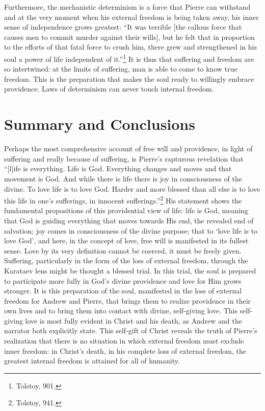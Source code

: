 \documentclass[12pt]{article}
\begin{document}
Furthermore, the mechanistic determinism is a force that Pierre can withstand and at the very moment when his external freedom is being taken away, his inner sense of independence grows greatest: ``It was terrible [the callous force that causes men to commit murder against their wills], but he felt that in proportion to the efforts of that fatal force to crush him, there grew and strengthened in his soul a power of life independent of it.''\footnote{Tolstoy, 901.} It is thus that suffering and freedom are so intertwined: at the limits of suffering, man is able to come to know true freedom. This is the preparation that makes the soul ready to willingly embrace providence. Laws of determinism can never touch internal freedom.

\section{Summary and Conclusions}

Perhaps the most comprehensive account of free will and providence, in light of suffering and really because of suffering, is Pierre’s rapturous revelation that ``[l]ife is everything. Life is God. Everything changes and moves and that movement is God. And while there is life there is joy in consciousness of the divine. To love life is to love God. Harder and more blessed than all else is to love this life in one’s sufferings, in innocent sufferings.''\footnote{Tolstoy, 941.} His statement shows the fundamental propositions of this providential view of life: life is God, meaning that God is guiding everything that moves towards His end, the revealed end of salvation; joy comes in consciousness of the divine purpose; that to `love life is to love God’, and here, in the concept of love, free will is manifested in its fullest sense. Love by its very definition cannot be coerced, it must be freely given. Suffering, particularly in the form of the loss of external freedom, through the Karataev lens might be thought a blessed trial. In this trial, the soul is prepared to participate more fully in God’s divine providence and love for Him grows stronger. It is this preparation of the soul, manifested in the loss of external freedom for Andrew and Pierre, that brings them to realize providence in their own lives and to bring them into contact with divine, self-giving love. This self-giving love is most fully evident in Christ and his death, as Andrew and the narrator both explicitly state. This self-gift of Christ reveals the truth of Pierre’s realization that there is no situation in which external freedom must exclude inner freedom: in Christ’s death, in his complete loss of external freedom, the greatest internal freedom is attained for all of humanity.
\end{document}
